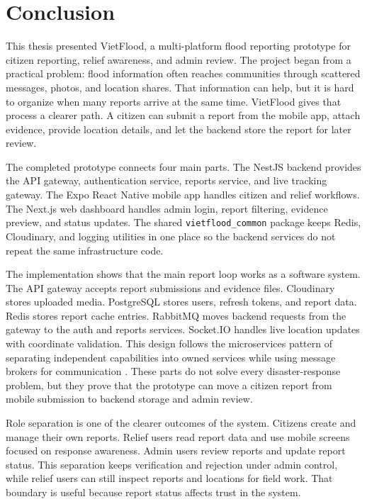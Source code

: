 \begingroup
\titlespacing*{\section}{0pt}{0.8em}{0.45em}

\section{Conclusion}
This thesis presented VietFlood, a multi-platform flood reporting prototype for citizen reporting, relief awareness, and admin review. The project began from a practical problem: flood information often reaches communities through scattered messages, photos, and location shares. That information can help, but it is hard to organize when many reports arrive at the same time. VietFlood gives that process a clearer path. A citizen can submit a report from the mobile app, attach evidence, provide location details, and let the backend store the report for later review.

The completed prototype connects four main parts. The NestJS backend provides the API gateway, authentication service, reports service, and live tracking gateway. The Expo React Native mobile app handles citizen and relief workflows. The Next.js web dashboard handles admin login, report filtering, evidence preview, and status updates. The shared \texttt{vietflood\_common} package keeps Redis, Cloudinary, and logging utilities in one place so the backend services do not repeat the same infrastructure code.

The implementation shows that the main report loop works as a software system. The API gateway accepts report submissions and evidence files. Cloudinary stores uploaded media. PostgreSQL stores users, refresh tokens, and report data. Redis stores report cache entries. RabbitMQ moves backend requests from the gateway to the auth and reports services. Socket.IO handles live location updates with coordinate validation. This design follows the microservices pattern of separating independent capabilities into owned services while using message brokers for communication \cite{fowlerLewis2014microservices,dragoni2017microservices,thones2015microservices}. These parts do not solve every disaster-response problem, but they prove that the prototype can move a citizen report from mobile submission to backend storage and admin review.

Role separation is one of the clearer outcomes of the system. Citizens create and manage their own reports. Relief users read report data and use mobile screens focused on response awareness. Admin users review reports and update report status. This separation keeps verification and rejection under admin control, while relief users can still inspect reports and locations for field work. That boundary is useful because report status affects trust in the system.

